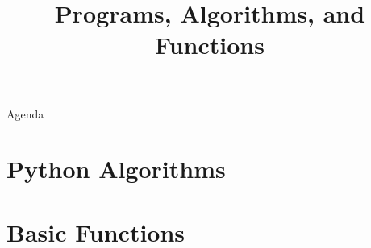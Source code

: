 \documentclass[../main.tex]{subfiles}
\title{Programs, Algorithms, and Functions}
\begin{document}
\begin{frame}
  \maketitle
\end{frame}
\begin{frame}{Agenda}
  \tableofcontents
\end{frame}




\section{Python Algorithms}
\label{sec:algorithms}


\section{Basic Functions}
\label{sec:functions}



\end{document}

